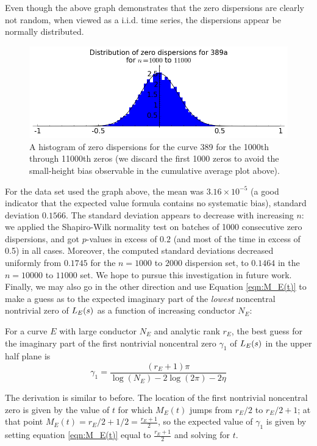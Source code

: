 Even though the above graph demonstrates that the zero dispersions are clearly not random, when viewed as a i.i.d. time series, the dispersions appear be normally distributed. \\

\begin{figure}[!h]
    \centering
    \includegraphics[width=1.0\textwidth]{graphics/389a_zero_dispersions_histagram.png}
    \caption{A histogram of zero dispersions for the curve 389 for the 1000th through 11000th zeros (we discard the first 1000 zeros to avoid the small-height bias observable in the cumulative average plot above). }
    \label{fig:389a_zero_dispersions_histagram}
\end{figure}

For the data set used the graph above, the mean was $3.16\times10^{-5}$ (a good indicator that the expected value formula contains no systematic bias), standard deviation $0.1566$. The standard deviation appears to decrease with increasing $n$: we applied the Shapiro-Wilk normality test on batches of 1000 consecutive zero dispersions, and got $p$-values in excess of $0.2$ (and most of the time in excess of 0.5) in all cases. Moreover, the computed standard deviations decreased uniformly from $0.1745$ for the $n=1000$ to $2000$ dispersion set, to $0.1464$ in the $n=10000$ to $11000$ set. We hope to pursue this investigation in future work. \\

Finally, we may also go in the other direction and use Equation \ref{eqn:M_E(t)} to make a guess as to the expected imaginary part of the {\it lowest} noncentral nontrivial zero of $L_E(s)$ as a function of increasing conductor $N_E$:
\begin{proposition}[GRH]
For a curve $E$ with large conductor $N_E$ and analytic rank $r_E$, the best guess for the imaginary part of the first nontrivial noncentral zero $\gamma_1$ of $L_E(s)$ in the upper half plane is
\begin{equation}
\gamma_1 = \frac{(r_E+1)\pi}{\log(N_E) -2\log(2\pi) -2\eta}
\end{equation}
\end{proposition}
The derivation is similar to before. The location of the first nontrivial noncentral zero is given by the value of $t$ for which $M_E(t)$ jumps from $r_E/2$ to $r_E/2+1$; at that point $M_E(t) = r_E/2 + 1/2 = \frac{r_E+1}{2}$, so the expected value of $\gamma_1$ is given by setting equation \ref{eqn:M_E(t)} equal to $\frac{r_E+1}{2}$ and solving for $t$. \\

